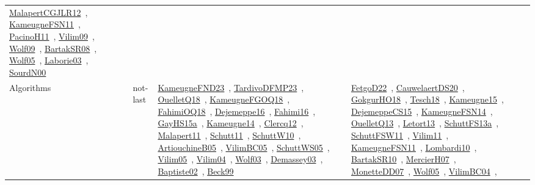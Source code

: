 {\begin{longtable}{lp{3cm}>{\raggedright\arraybackslash}p{6cm}>{\raggedright\arraybackslash}p{6cm}>{\raggedright\arraybackslash}p{8cm}}
\href{../works/MalapertCGJLR12.pdf}{MalapertCGJLR12}~\cite{MalapertCGJLR12}, \href{../works/KameugneFSN11.pdf}{KameugneFSN11}~\cite{KameugneFSN11}, \href{../works/PacinoH11.pdf}{PacinoH11}~\cite{PacinoH11}, \href{../works/Vilim09.pdf}{Vilim09}~\cite{Vilim09}, \href{../works/Wolf09.pdf}{Wolf09}~\cite{Wolf09}, \href{../works/BartakSR08.pdf}{BartakSR08}~\cite{BartakSR08}, \href{../works/Wolf05.pdf}{Wolf05}~\cite{Wolf05}, \href{../works/Laborie03.pdf}{Laborie03}~\cite{Laborie03}, \href{../works/SourdN00.pdf}{SourdN00}~\cite{SourdN00}\\
\index{not-last}\index{Algorithms!not-last}Algorithms & not-last & \href{../works/KameugneFND23.pdf}{KameugneFND23}~\cite{KameugneFND23}, \href{../works/TardivoDFMP23.pdf}{TardivoDFMP23}~\cite{TardivoDFMP23}, \href{../works/OuelletQ18.pdf}{OuelletQ18}~\cite{OuelletQ18}, \href{../works/KameugneFGOQ18.pdf}{KameugneFGOQ18}~\cite{KameugneFGOQ18}, \href{../works/FahimiOQ18.pdf}{FahimiOQ18}~\cite{FahimiOQ18}, \href{../works/Dejemeppe16.pdf}{Dejemeppe16}~\cite{Dejemeppe16}, \href{../works/Fahimi16.pdf}{Fahimi16}~\cite{Fahimi16}, \href{../works/GayHS15a.pdf}{GayHS15a}~\cite{GayHS15a}, \href{../works/Kameugne14.pdf}{Kameugne14}~\cite{Kameugne14}, \href{../works/Clercq12.pdf}{Clercq12}~\cite{Clercq12}, \href{../works/Malapert11.pdf}{Malapert11}~\cite{Malapert11}, \href{../works/Schutt11.pdf}{Schutt11}~\cite{Schutt11}, \href{../works/SchuttW10.pdf}{SchuttW10}~\cite{SchuttW10}, \href{../works/ArtiouchineB05.pdf}{ArtiouchineB05}~\cite{ArtiouchineB05}, \href{../works/VilimBC05.pdf}{VilimBC05}~\cite{VilimBC05}, \href{../works/SchuttWS05.pdf}{SchuttWS05}~\cite{SchuttWS05}, \href{../works/Vilim05.pdf}{Vilim05}~\cite{Vilim05}, \href{../works/Vilim04.pdf}{Vilim04}~\cite{Vilim04}, \href{../works/Wolf03.pdf}{Wolf03}~\cite{Wolf03}, \href{../works/Demassey03.pdf}{Demassey03}~\cite{Demassey03}, \href{../works/Baptiste02.pdf}{Baptiste02}~\cite{Baptiste02}, \href{../works/Beck99.pdf}{Beck99}~\cite{Beck99} & \href{../works/FetgoD22.pdf}{FetgoD22}~\cite{FetgoD22}, \href{../works/CauwelaertDS20.pdf}{CauwelaertDS20}~\cite{CauwelaertDS20}, \href{../works/GokgurHO18.pdf}{GokgurHO18}~\cite{GokgurHO18}, \href{../works/Tesch18.pdf}{Tesch18}~\cite{Tesch18}, \href{../works/Kameugne15.pdf}{Kameugne15}~\cite{Kameugne15}, \href{../works/DejemeppeCS15.pdf}{DejemeppeCS15}~\cite{DejemeppeCS15}, \href{../works/KameugneFSN14.pdf}{KameugneFSN14}~\cite{KameugneFSN14}, \href{../works/OuelletQ13.pdf}{OuelletQ13}~\cite{OuelletQ13}, \href{../works/Letort13.pdf}{Letort13}~\cite{Letort13}, \href{../works/SchuttFS13a.pdf}{SchuttFS13a}~\cite{SchuttFS13a}, \href{../works/SchuttFSW11.pdf}{SchuttFSW11}~\cite{SchuttFSW11}, \href{../works/Vilim11.pdf}{Vilim11}~\cite{Vilim11}, \href{../works/KameugneFSN11.pdf}{KameugneFSN11}~\cite{KameugneFSN11}, \href{../works/Lombardi10.pdf}{Lombardi10}~\cite{Lombardi10}, \href{../works/BartakSR10.pdf}{BartakSR10}~\cite{BartakSR10}, \href{../works/MercierH07.pdf}{MercierH07}~\cite{MercierH07}, \href{../works/MonetteDD07.pdf}{MonetteDD07}~\cite{MonetteDD07}, \href{../works/Wolf05.pdf}{Wolf05}~\cite{Wolf05}, \href{../works/VilimBC04.pdf}{VilimBC04}~\cite{VilimBC04}, 
\end{longtable}}
